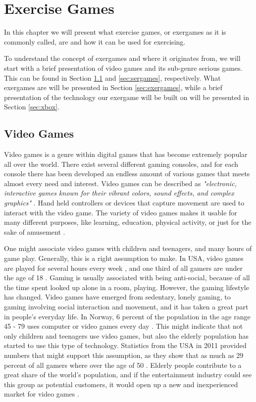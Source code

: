 \chapter{Exercise Games}
\label{chap:exergames}
In this chapter we will present what exercise games, or exergames as it is commonly called, are and how it can be used for exercising.  

To understand the concept of exergames and where it originates from, we will start with a brief presentation of video games and its sub-genre serious games. This can be found in Section \ref{sec:videogamess} and \ref{sec:sergames}, respectively.  What exergames are will be presented in Section \ref{sec:exergames}, while a brief presentation of the technology our exergame will be built on will be presented in Section \ref{sec:xbox}.
\section{Video Games}
\label{sec:videogamess}

Video games is a genre within digital games that has become extremely popular all over the world. There exist several different gaming consoles, and for each console there has been developed an endless amount of various games that meets almost every need and interest. Video games can be described as \emph{"electronic, interactive games known for their vibrant colors, sound effects, and complex graphics"} \cite{videogamedef}. Hand held controllers or devices that capture movement are used to interact with the video game. The variety of video games makes it usable for many different purposes, like learning, education, physical activity, or just for the sake of amusement \cite{project}. 

One might associate video games with children and teenagers, and many hours of game play. Generally, this is a right assumption to make. In USA, video games are played for several hours every week \cite{foxnews}, and one third of all gamers are under the age of 18 \cite{videogames2012}. Gaming is usually associated with being anti-social, because of all the time spent looked up alone in a room, playing. However, the gaming lifestyle has changed. Video games have emerged from sedentary, lonely gaming, to gaming involving social interaction and movement, and it has taken a great part in people's everyday life. In Norway, 6 percent of the population in the age range 45 - 79 uses computer or video games every day \cite{mediebarometer2012}. This might indicate that not only children and teenagers use video games, but also the elderly population has started to use this type of technology. Statistics from the USA in 2011 provided numbers that might support this assumption, as they show that as much as 29 percent of all gamers where over the age of 50 \cite{videogames2011}. Elderly people contribute to a great share of the world's population, and if the entertainment industry could see this group as potential customers, it would open up a new and inexperienced market for video games \cite{ijsselsteijn2007digital}. 

